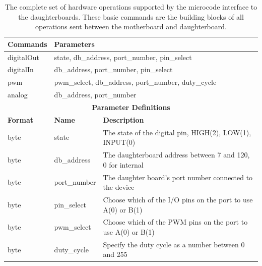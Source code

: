 	\begin{table}[h] 
        \centering
          \scriptsize {%
            
	      \begin{tabular}{|l|l|l|}
	      	\hline
	      	\textbf{Commands} &  \multicolumn{2}{l|}{\textbf{Parameters}}\\\hline
	      	digitalOut & \multicolumn{2}{l|}{state, db\_address, port\_number, pin\_select}\\\hline
			digitalIn & \multicolumn{2}{l|}{db\_address, port\_number, pin\_select}\\\hline
			pwm & \multicolumn{2}{l|}{pwm\_select, db\_address, port\_number, duty\_cycle}\\\hline
			analog & \multicolumn{2}{l|}{db\_address, port\_number}\\\hline
			\toprule 
	        \multicolumn{3}{c}{\textbf{Parameter Definitions}} \\\hline
            \textbf{Format} & \textbf{Name} & \textbf{Description}\\\hline
			byte & state & The state of the digital pin, HIGH(2), LOW(1), INPUT(0) \\\hline
			byte  & db\_address & The daughterboard address between 7 and 120, 0 for internal \\\hline
			byte  & port\_number & The daughter board's port number connected to the device \\\hline
			byte  & pin\_select & Choose which of the I/O pins on the port to use A(0) or B(1) \\\hline
			byte  & pwm\_select & Choose which of the PWM pins on the port to use A(0) or B(1) \\\hline
			byte  & duty\_cycle & Specify the duty cycle as a number between 0 and 255 \\\hline
            \end{tabular} 
            }
	  \caption{The complete set of hardware operations supported by the
	    microcode interface to the daughterboards. These basic commands are the building blocks of all operations sent between the motherboard and daughterboard.}
	  \label{tab:microcode}
	\end{table}
	\normalsize


